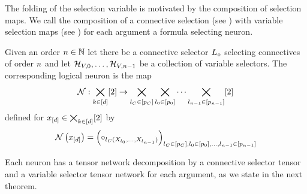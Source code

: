 

The folding of the selection variable is motivated by the composition of selection maps.
We call the composition of a connective selection (see ) with variable selection maps (see ) for each argument a formula selecting neuron.


\begin{definition}
    \label{def:fsNeuron}
    Given an order $n\in\mathbb{N}$ let there be a connective selector $L_{\circ}$ selecting connectives of order $n$ and let $\mathcal{H}_{V,0},\ldots,\mathcal{H}_{V,n-1}$ be a collection of variable selectors.
    The corresponding logical neuron is the map
    \begin{align*}
        \mathcal{N} : \bigtimes_{k\in[d]}[2] \rightarrow \bigtimes_{l_{C}\in[p_{C}]} \bigtimes_{l_{0}\in[p_{0}]} \cdots \bigtimes_{l_{n-1}\in[p_{n-1}]} [2]
    \end{align*}
    defined for $x_{[d]}\in\bigtimes_{k\in[d]}[2]$ by
    \begin{align*}
        \mathcal{N}\left(x_{[d]}\right)
        = \left( \circ_{l_{C}(X_{l_{0}},\ldots,X_{l_{n-1}})}\right)_{l_{C}\in[p_{C}],l_{0}\in[p_{0}],\ldots,l_{n-1}\in[p_{n-1}]}
    \end{align*}
\end{definition}

Each neuron has a tensor network decomposition by a connective selector tensor and a variable selector tensor network for each argument, as we state in the next theorem.

